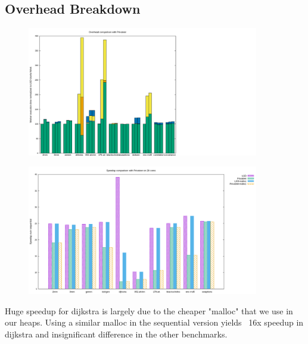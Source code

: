 \subsection{Overhead Breakdown}

\begin{figure}[htp]
  \includegraphics[width=0.9\textwidth]{figures/overheads}
\end{figure}
\begin{figure}[htp]
  \includegraphics[width=0.9\textwidth]{figures/comparison}
\end{figure}
Huge speedup for dijkstra is largely due to the cheaper "malloc" that
we use in our heaps. Using a similar malloc in the sequential version
yields ~16x speedup in dijkstra and insignificant difference in the
other benchmarks.

